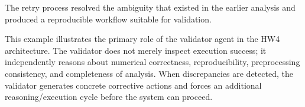 The retry process resolved the ambiguity that existed in the earlier analysis and produced a reproducible workflow suitable for validation.


This example illustrates the primary role of the validator agent in the HW4 architecture. The validator does not merely inspect execution success; it independently reasons about numerical correctness, reproducibility, preprocessing consistency, and completeness of analysis. When discrepancies are detected, the validator generates concrete corrective actions and forces an additional reasoning/execution cycle before the system can proceed.
